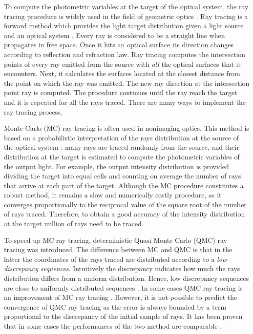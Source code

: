 To compute the photometric variables at the target of the
optical system, the ray tracing procedure is widely used in the field of geometric optics \cite{glassner1989introduction}.
Ray tracing is a forward method which provides the light target distribution given a light source and an optical system \cite{Gross2005Handbook}. Every ray is considered to be a straight line when propagates in free space. Once it hits an optical surface its direction changes according to reflection and refraction law. Ray tracing computes the intersection points of every ray emitted from the source with \textit{all} the optical surfaces that it encounters. Next, it calculates the surfaces located at the closest distance from the point on which the ray was emitted. The new ray direction at the intersection point ray is computed. The procedure continues until the ray reach the target and it is repeated for all the rays traced.
There are many ways to implement the ray tracing process.

Monte Carlo (MC) ray tracing is often used in nonimaging
optics. This method is based on a probabilistic interpretation
of the rays distribution at the source of the optical
system \cite{liu2010precise,Ting:1}: many rays are traced randomly from the source,
and their distribution at the target is estimated to compute the
photometric variables of the output light. For example, the output intensity distribution is provided dividing the target into equal cells and counting on average the number of rays that arrive at each part of the target. Although the MC
procedure constitutes a robust method, it remains a slow and
numerically costly procedure, as it converges proportionally
to the reciprocal value of the square root of the number of rays
traced. Therefore, to obtain a good accuracy of the intensity distribution at the target million of rays need to be traced.

To speed up MC ray tracing, deterministic Quasi-Monte Carlo (QMC) ray tracing was introduced. The difference between MC and QMC is that in the latter the coordinates of the rays traced are distributed according to a \textit{low-discrepancy sequences}. Intuitively the discrepancy indicates how much the rays distribution differs from a uniform distribution.  Hence, low discrepancy sequences are close to uniformly distributed sequences \cite{levy2002introduction}.
In some cases QMC ray tracing is an improvement of MC ray tracing \cite{ohbuchi1996quasi, caflisch1998monte}. However, it is not possible to predict the convergence of QMC ray tracing as the error is always bounded by a term proportional to the discrepancy of the initial sample of rays. It has been proven that in some cases the performances of the two method are comparable \cite{tuffin2004randomization}.

